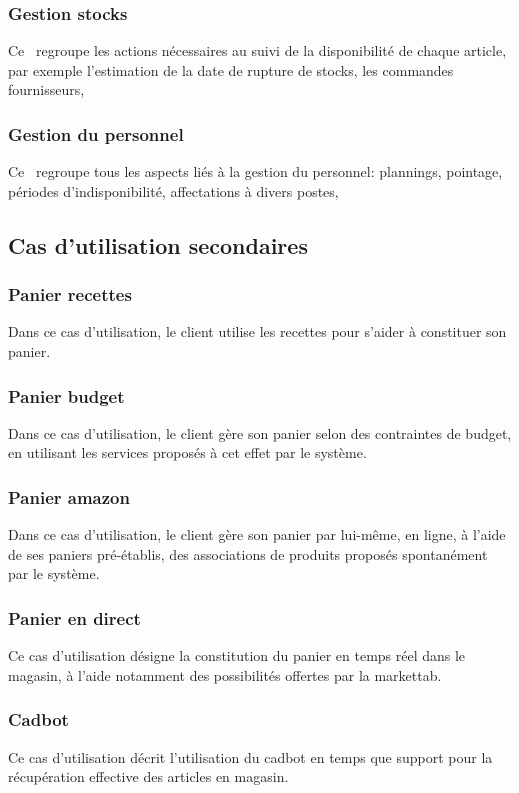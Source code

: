 \subsubsection{Gestion stocks}
Ce \cu\ regroupe les actions nécessaires au suivi de la disponibilité de chaque article, par exemple l'estimation de la date de rupture de stocks, les commandes fournisseurs, \etc

\subsubsection{Gestion du personnel}
Ce \cu\ regroupe tous les aspects liés à la gestion du personnel: plannings, pointage, périodes d'indisponibilité, affectations à divers postes, \etc

\subsection{Cas d'utilisation secondaires}

\subsubsection{Panier recettes}
Dans ce cas d'utilisation, le client utilise les recettes pour s'aider à constituer son panier.

\subsubsection{Panier budget}
Dans ce cas d'utilisation, le client gère son panier selon des contraintes de budget, en utilisant les services proposés à cet effet par le système.

\subsubsection{Panier amazon}
Dans ce cas d'utilisation, le client gère son panier par lui-même, en ligne, à l'aide de ses paniers pré-établis, des associations de produits proposés spontanément par le système.

\subsubsection{Panier en direct}
Ce cas d'utilisation désigne la constitution du panier en temps réel dans le magasin, à l'aide notamment des possibilités offertes par la markettab.

\subsubsection{Cadbot}
Ce cas d'utilisation décrit l'utilisation du cadbot en temps que support pour la récupération effective des articles en magasin.

